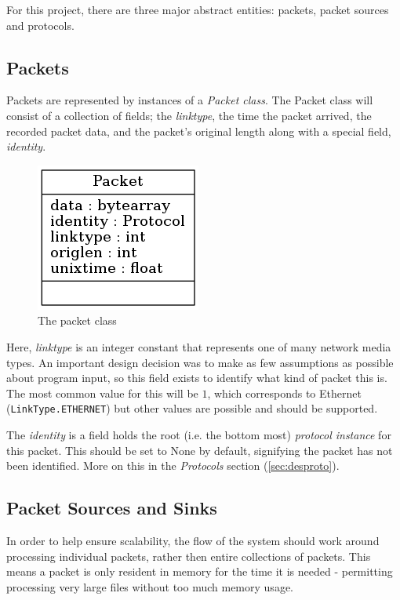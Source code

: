 \documentclass[10pt,a4paper,notitlepage]{report}
\begin{document}
For this project, there are three major abstract entities: packets, packet sources and protocols.

\subsection{Packets}
Packets are represented by instances of a \emph{Packet class}. The Packet class will consist of a collection of fields; the \emph{linktype}, the time the packet arrived, the recorded packet data, and the packet's original length along with a special field, \emph{identity}.

\begin{figure}
\center
\includegraphics[scale=0.7]{diagrams/packet.png}
\caption{The packet class}
\end{figure}

Here, \emph{linktype} is an integer constant that represents one of many network media types. An important design decision was to make as few assumptions as possible about program input, so this field exists to identify what kind of packet this is. The most common value for this will be $1$, which corresponds to Ethernet (\texttt{LinkType.ETHERNET}) but other values are possible and should be supported.

The \emph{identity} is a field holds the root (i.e. the bottom most) \emph{protocol instance}  for this packet. This should be set to None by default, signifying the packet has not been identified. More on this in the \emph{Protocols} section (\ref{sec:desproto}).

\subsection{Packet Sources and Sinks}
\label{sec:despacksrc}
In order to help ensure scalability, the flow of the system should work around processing individual packets, rather then entire collections of packets. This means a packet is only resident in memory for the time it is needed - permitting processing very large files without too much memory usage. 
\end{document}
